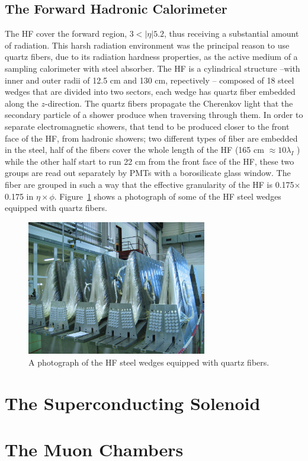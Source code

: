 \subsection{The Forward Hadronic Calorimeter}
The HF cover the forward region, $3 < |\eta| 5.2$, thus receiving a
substantial amount of radiation. This harsh radiation environment was
the principal reason to use quartz fibers, due to its radiation
hardness properties, as the active medium of a
sampling calorimeter with steel absorber. The HF is a cylindrical
structure --with inner and outer radii of 12.5 cm and 130 cm, repectively -- composed of 18
steel wedges that are divided into two sectors, each wedge has quartz
fiber embedded along the $z$-direction. The quartz fibers propagate
the Cherenkov light that the secondary particle of a shower produce
when traversing through them. In order to separate electromagnetic
showers, that tend to be produced closer to the front face of the HF,
from hadronic showers; two different types of fiber are embedded in
the steel, half of the fibers cover the whole length of the HF (165 cm
$\approx 10\lambda_{I}$ ) while the other half start to run 22 cm from
the front face of the HF, these two groups are read out
separately by PMTs with a borosilicate glass window. The fiber are grouped in such a way that the effective
granularity of the HF is 0.175$\times$0.175 in
$\eta\times\phi$. Figure~\ref{fig:HF_photo} shows a photograph of some
of the HF steel wedges equipped with quartz fibers.
\begin{figure}
 \centering
\includegraphics[width=0.7\textwidth]{CMS_DetectorFigures/HF_cal.jpg}
\caption{A photograph of the HF steel wedges equipped with quartz fibers.\label{fig:HF_photo}}
\end{figure}

\section{The Superconducting Solenoid}
\section{The Muon Chambers}